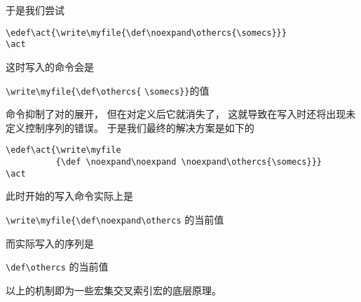 \documentclass{book}
\begin{document}
于是我们尝试
\begin{verbatim}
\edef\act{\write\myfile{\def\noexpand\othercs{\somecs}}}
\act
\end{verbatim} 
这时写入的命令会是
\begin{disp}\verb>\write\myfile{\def\othercs{>\italic
     \verb>\somecs}}>的值\end{disp}
命令抑制了对的展开，
但在对定义后它就消失了，
这就导致在写入时还将出现未定义控制序列的错误。
于是我们最终的解决方案是如下的
\begin{verbatim}
\edef\act{\write\myfile
          {\def \noexpand\noexpand \noexpand\othercs{\somecs}}}
\act
\end{verbatim} 
此时开始的写入命令实际上是
\begin{disp}\verb>\write\myfile{\def\noexpand\othercs>\lb
     {\italic {}的当前值}\rb\end{disp}
而实际写入的序列是
\begin{disp}\verb>\def\othercs>\lb
     {\italic {}的当前值}\rb\end{disp}
以上的机制即为一些宏集交叉索引宏的底层原理。
\end{document}
